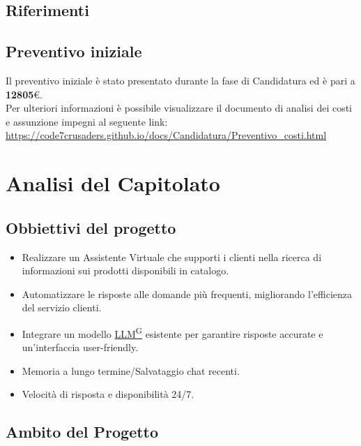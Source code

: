\documentclass{article}
\begin{document}
    \subsection{Riferimenti}

    \subsection{Preventivo iniziale}
    Il preventivo iniziale è stato presentato durante la fase di Candidatura ed è pari a \textbf{12805}\euro.
    \\ Per ulteriori informazioni è possibile visualizzare il documento di analisi dei costi e assunzione impegni al seguente link:
    \\ \url{https://code7crusaders.github.io/docs/Candidatura/Preventivo_costi.html}




\newpage
\section{Analisi del Capitolato}
    \subsection{Obbiettivi del progetto}
    \begin{itemize}
        \item Realizzare un Assistente Virtuale che supporti i clienti nella ricerca
        di informazioni sui prodotti disponibili in catalogo.
        \item Automatizzare le risposte alle domande più frequenti, migliorando
        l'efficienza del servizio clienti.
        \item Integrare un modello \href{https://code7crusaders.github.io/docs/RTB/documentazione_interna/glossario.html#llm-large-language-model}{LLM\textsuperscript{G}} esistente per garantire risposte accurate e
        un'interfaccia user-friendly.
        \item Memoria a lungo termine/Salvataggio chat recenti.
        \item Velocità di risposta e disponibilità 24/7.
    \end{itemize}

    \subsection{Ambito del Progetto}
\end{document}
